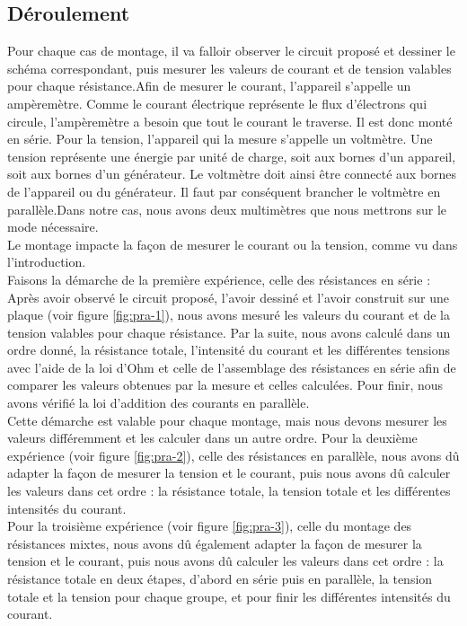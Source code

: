 \documentclass[11pt]{article}
\begin{document}
\subsection{Déroulement}

Pour chaque cas de montage, il va falloir observer le circuit proposé et dessiner le schéma correspondant, puis mesurer les valeurs de courant et de tension valables pour chaque résistance.Afin de mesurer le courant, l’appareil s’appelle un ampèremètre. Comme le courant électrique représente le flux d’électrons qui circule, l’ampèremètre a besoin que tout le courant le traverse. Il est donc monté en série. Pour la tension, l’appareil qui la mesure s’appelle un voltmètre. Une tension représente une énergie par unité de charge, soit aux bornes d’un appareil, soit aux bornes d’un générateur. Le voltmètre doit ainsi être connecté aux bornes de l’appareil ou du générateur. Il faut par conséquent brancher le voltmètre en parallèle.Dans notre cas, nous avons deux multimètres que nous mettrons sur le mode nécessaire.\\ 
Le montage impacte la façon de mesurer le courant ou la tension, comme vu dans l'introduction.\\

Faisons la démarche de la première expérience, celle des résistances en série :\\

Après avoir observé le circuit proposé, l’avoir dessiné et l’avoir construit sur une plaque (voir figure \ref{fig:pra-1}), nous avons mesuré les valeurs du courant et de la tension valables pour chaque résistance. Par la suite, nous avons calculé dans un ordre donné, la résistance totale, l’intensité du courant et les différentes tensions avec l’aide de la loi d’Ohm et celle de l’assemblage des résistances en série afin de comparer les valeurs obtenues par la mesure et celles calculées. Pour finir, nous avons vérifié la loi d’addition des courants en parallèle.\\  

Cette démarche est valable pour chaque montage, mais nous devons mesurer les valeurs différemment et les calculer dans un autre ordre. Pour la deuxième expérience (voir figure \ref{fig:pra-2}), celle des résistances en parallèle, nous avons dû adapter la façon de mesurer la tension et le courant, puis nous avons dû calculer les valeurs dans cet ordre : la résistance totale, la tension totale et les différentes intensités du courant.\\
Pour la troisième expérience (voir figure \ref{fig:pra-3}), celle du montage des résistances mixtes, nous avons dû également adapter la façon de mesurer la tension et le courant, puis nous avons dû calculer les valeurs dans cet ordre : la résistance totale en deux étapes, d’abord en série puis en parallèle, la tension totale et la tension pour chaque groupe, et pour finir les différentes intensités du courant.\\  
\end{document}
